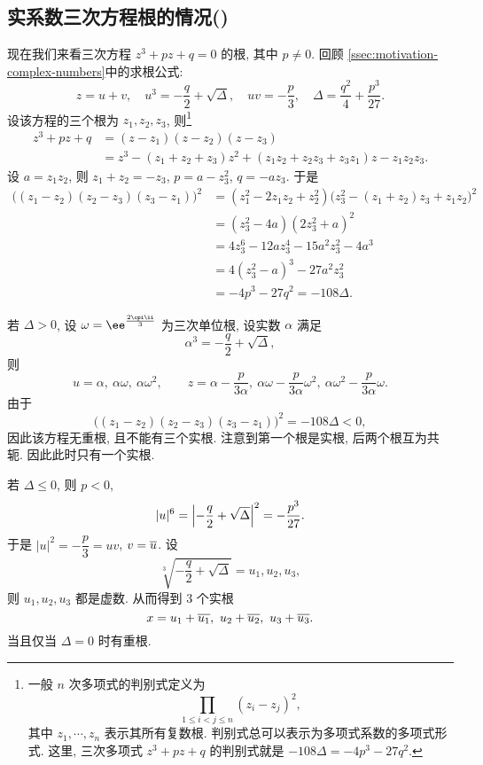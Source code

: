 \subsection{实系数三次方程根的情况(\optional)}
\label{ssec:real-cubic-equation}

现在我们来看三次方程 $z^3+pz+q=0$ 的根, 其中 $p\neq 0$.
回顾 \ref{ssec:motivation-complex-numbers}中的求根公式:
\[
  z=u+v,\quad 
  u^3=-\frac q2+\sqrt{\Delta},\quad 
  uv=-\frac p3,\quad 
  \Delta=\frac{q^2}4+\frac{p^3}{27}.
\]
设该方程的三个根为 $z_1,z_2,z_3$, 则\footnote{%
  一般 $n$ 次多项式的判别式定义为
  \[
    \prod_{1\le i<j\le n}(z_i-z_j)^2,
  \]
  其中 $z_1,\cdots,z_n$ 表示其所有复数根.
  判别式总可以表示为多项式系数的多项式形式.
  这里, 三次多项式 $z^3+pz+q$ 的判别式就是 $-108\Delta=-4p^3-27q^2$.
}
\begin{align*}
   z^3+pz+q&
  =(z-z_1)(z-z_2)(z-z_3)\\&
  =z^3-(z_1+z_2+z_3)z^2+(z_1z_2+z_2z_3+z_3z_1)z-z_1z_2z_3.
\end{align*}
设 $a=z_1z_2$, 则 $z_1+z_2=-z_3$, $p=a-z_3^2$, $q=-az_3$.
于是
\begin{align*}
   \bigl((z_1-z_2)(z_2-z_3)(z_3-z_1)\bigr)^2&
  =(z_1^2-2z_1z_2+z_2^2)\bigl(z_3^2-(z_1+z_2)z_3+z_1z_2\bigr)^2\\&
  =(z_3^2-4a)(2z_3^2+a)^2\\&
  =4z_3^6-12az_3^4-15a^2z_3^2-4a^3\\&
  =4(z_3^2-a)^3-27a^2z_3^2\\&
  =-4p^3-27q^2
  =-108\Delta.
\end{align*}

\begin{enuma}
  \item 若 $\Delta>0$, 设 $\omega=\ee^{\frac{2\cpi \ii}3}$ 为三次单位根, 设实数 $\alpha$ 满足
  \[\alpha^3=-\frac q2+\sqrt{\Delta},\]
  则
  \[
    u=\alpha,\ \alpha\omega,\ \alpha\omega^2,\qquad
    z=\alpha-\frac p{3\alpha},\ 
      \alpha\omega-\frac p{3\alpha} \omega^2,\ 
      \alpha\omega^2-\frac p{3\alpha} \omega.
  \]
  由于
  \[
      \bigl((z_1-z_2)(z_2-z_3)(z_3-z_1)\bigr)^2
    =-108\Delta<0,
  \]
  因此该方程无重根, 且不能有三个实根.
  注意到第一个根是实根, 后两个根互为共轭.
  因此此时只有一个实根.
  \item 若 $\Delta\le 0$, 则 $p<0$,
  \[
    |u|^6=\left|-\frac q2+\sqrt\Delta\right|^2=-\frac{p^3}{27}.
  \]
  于是 $|u|^2=-\dfrac p3=uv$, $v=\overline u$.
  设
  \[
    \sqrt[3]{-\frac q2+\sqrt{\Delta}}=u_1,u_2,u_3,
  \]
  则 $u_1,u_2,u_3$ 都是虚数. 从而得到 $3$ 个实根
  \[
    x=u_1+\ov{u_1},\ u_2+\ov{u_2},\ u_3+\ov{u_3}.
  \]
  当且仅当 $\Delta=0$ 时有重根.
\end{enuma}


